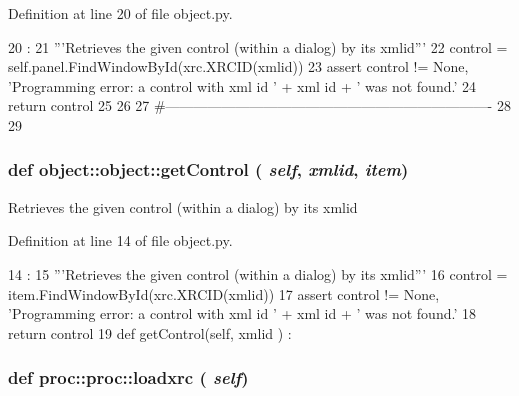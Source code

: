 Definition at line 20 of file object.py.


\begin{DoxyCode}
20                                  :
21         '''Retrieves the given control (within a dialog) by its xmlid'''
22         control = self.panel.FindWindowById(xrc.XRCID(xmlid))
23         assert control != None, 'Programming error: a control with xml id ' + xml
      id + ' was not found.'
24         return control
25 
26                 
27 #----------------------------------------------------------------------
28 
29     
    
\end{DoxyCode}
\hypertarget{classobject_1_1object_ac765747a2b581d48eeb94e600c31fc3f}{
\subsubsection[{getControl}]{\setlength{\rightskip}{0pt plus 5cm}def object::object::getControl ( {\em self}, \/   {\em xmlid}, \/   {\em item})}}
\label{classobject_1_1object_ac765747a2b581d48eeb94e600c31fc3f}
\begin{DoxyVerb}Retrieves the given control (within a dialog) by its xmlid\end{DoxyVerb}
 

Definition at line 14 of file object.py.


\begin{DoxyCode}
14                                        :
15         '''Retrieves the given control (within a dialog) by its xmlid'''
16         control = item.FindWindowById(xrc.XRCID(xmlid))
17         assert control != None, 'Programming error: a control with xml id ' + xml
      id + ' was not found.'
18         return control
19 
    def getControl(self, xmlid ) :
\end{DoxyCode}
\hypertarget{classproc_1_1proc_a2192e09617c5de1798ca71123cb390bb}{
\subsubsection[{loadxrc}]{\setlength{\rightskip}{0pt plus 5cm}def proc::proc::loadxrc ( {\em self})}}
\label{classproc_1_1proc_a2192e09617c5de1798ca71123cb390bb}


